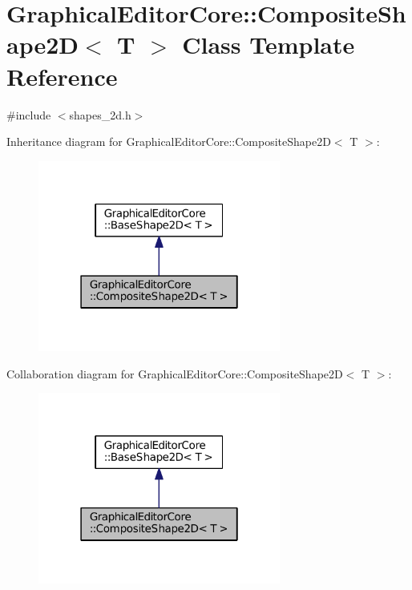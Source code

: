 \hypertarget{classGraphicalEditorCore_1_1CompositeShape2D}{}\section{Graphical\+Editor\+Core\+:\+:Composite\+Shape2D$<$ T $>$ Class Template Reference}
\label{classGraphicalEditorCore_1_1CompositeShape2D}


{\ttfamily \#include $<$shapes\+\_\+2d.\+h$>$}



Inheritance diagram for Graphical\+Editor\+Core\+:\+:Composite\+Shape2D$<$ T $>$\+:
\nopagebreak
\begin{figure}[H]
\begin{center}
\leavevmode
\includegraphics[width=226pt]{classGraphicalEditorCore_1_1CompositeShape2D__inherit__graph}
\end{center}
\end{figure}


Collaboration diagram for Graphical\+Editor\+Core\+:\+:Composite\+Shape2D$<$ T $>$\+:
\nopagebreak
\begin{figure}[H]
\begin{center}
\leavevmode
\includegraphics[width=226pt]{classGraphicalEditorCore_1_1CompositeShape2D__coll__graph}
\end{center}
\end{figure}
